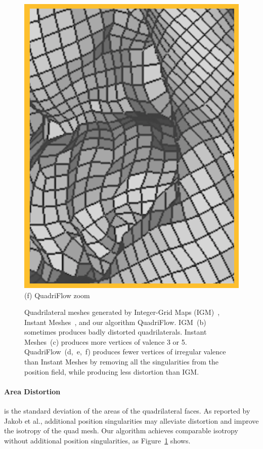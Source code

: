 \begin{figure}
\begin{minipage}{0.16\textwidth}
  \includegraphics[width=\textwidth,height=1.33\textwidth]{quadriflow/teaser/teasers2.png}\\
   (f) QuadriFlow zoom
   \end{minipage}

\caption{Quadrilateral meshes generated by Integer-Grid Maps (IGM)~\cite{bommes2013integer}, Instant Meshes~\cite{jakob2015instant}, and our algorithm QuadriFlow. IGM~(b) sometimes produces badly distorted quadrilaterals. Instant Meshes~(c) produces more vertices of valence 3 or 5. QuadriFlow~(d,~e,~f) produces fewer vertices of irregular valence than Instant Meshes by removing all the singularities from the position field, while producing less distortion than IGM.}
\label{fig:quad-teaser}
\end{figure}
\paragraph*{Area Distortion} is the standard deviation of the areas of the quadrilateral faces. As reported by Jakob et al., additional position singularities may alleviate distortion and improve the isotropy of the quad mesh. Our algorithm achieves comparable isotropy without additional position singularities, as Figure~\ref{fig:quad-teaser} shows.

